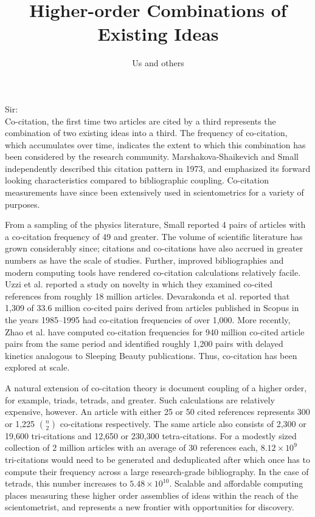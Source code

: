 \documentclass[notitlepage]{report}
\title{Higher-order Combinations of Existing Ideas}
\author{Us and others}
\date{}
\begin{document}
\maketitle
\thispagestyle{empty}
Sir:\\

Co-citation, the first time two articles are cited by a third represents the combination of two existing ideas into a third. The frequency of co-citation, which accumulates over time, indicates the extent to which this combination has been considered by the research community. Marshakova-Shaikevich and Small independently described this citation pattern in 1973, and emphasized its forward looking characteristics compared to bibliographic coupling. Co-citation measurements have since been extensively used in scientometrics for a variety of purposes.

From a sampling of the physics literature, Small reported 4 pairs of articles with a co-citation frequency of 49 and greater. The volume of scientific literature has grown considerably since; citations and co-citations have also accrued in greater numbers as have the scale of studies. Further, improved bibliographies and modern computing tools have rendered co-citation calculations relatively facile. Uzzi et al. reported a study on novelty in which they examined co-cited references from roughly 18 million articles. Devarakonda et al. reported that 1,309 of 33.6 million co-cited pairs derived from articles published in Scopus in the years 1985--1995 had co-citation frequencies of over 1,000. More recently, Zhao et al. have computed co-citation frequencies for 940 million co-cited article pairs from the same period and identified roughly 1,200 pairs with delayed kinetics analogous to Sleeping Beauty publications. Thus, co-citation has been explored at scale.

A natural extension of co-citation theory is document coupling of a higher order, for example, triads, tetrads, and greater. Such calculations are relatively expensive, however. An article with either 25 or 50 cited references represents 300 or 1,225 $n\choose2$ co-citations respectively. The same article also consists of  2,300 or 19,600 tri-citations and  12,650 or  230,300 tetra-citations. For a modestly sized collection of 2 million articles with an average of 30 references each, $8.12 \times10^9$ tri-citations would need to be generated and deduplicated after which once has to compute their frequency across a large research-grade bibliography. In the case of tetrads, this number increases to $5.48 \times 10^{10}$.  Scalable and affordable computing places measuring these higher order assemblies of ideas within the reach of the scientometrist, and represents a new frontier with opportunities for discovery.
\end{document}
